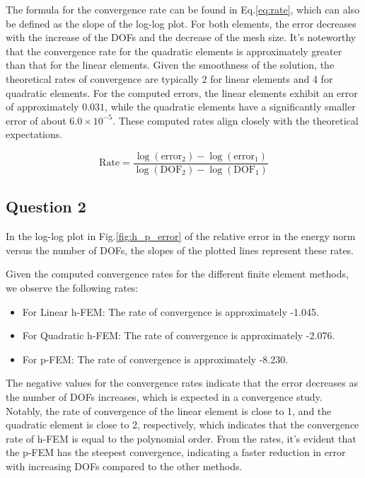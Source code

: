\documentclass[twoside,twocolumn,10pt]{article}
\begin{document}
The formula for the convergence rate can be found in Eq.\ref{eq:rate}, which can also be defined as the slope of the log-log plot. For both elements, the error decreases with the increase of the DOFs and the decrease of the mesh size. It's noteworthy that the convergence rate for the quadratic elements is approximately greater than that for the linear elements. Given the smoothness of the solution, the theoretical rates of convergence are typically 2 for linear elements and 4 for quadratic elements. For the computed errors, the linear elements exhibit an error of approximately \(0.031\), while the quadratic elements have a significantly smaller error of about \(6.0 \times 10^{-5}\). These computed rates align closely with the theoretical expectations.

\begin{equation}
\text{Rate} = \frac{\log(\text{error}_2) - \log(\text{error}_1)}{\log(\text{DOF}_2) - \log(\text{DOF}_1)}
\label{eq:rate}
\end{equation}

\subsection{Question 2}
In the log-log plot in Fig.\ref{fig:h_p_error} of the relative error in the energy norm versus the number of DOFs, the slopes of the plotted lines represent these rates. 

Given the computed convergence rates for the different finite element methods, we observe the following rates:
\begin{itemize}
    \item For Linear h-FEM: The rate of convergence is approximately -1.045.
    \item For Quadratic h-FEM: The rate of convergence is approximately -2.076.
    \item For p-FEM: The rate of convergence is approximately -8.230.
\end{itemize}
The negative values for the convergence rates indicate that the error decreases as the number of DOFs increases, which is expected in a convergence study. Notably, the rate of convergence of the linear element is close to 1, and the quadratic element is close to 2, respectively, which indicates that the convergence rate of h-FEM is equal to the polynomial order. From the rates, it's evident that the p-FEM has the steepest convergence, indicating a faster reduction in error with increasing DOFs compared to the other methods. 
\end{document}
